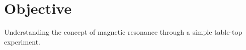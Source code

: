 \section{Objective}

Understanding the concept of magnetic resonance through a simple table-top experiment.